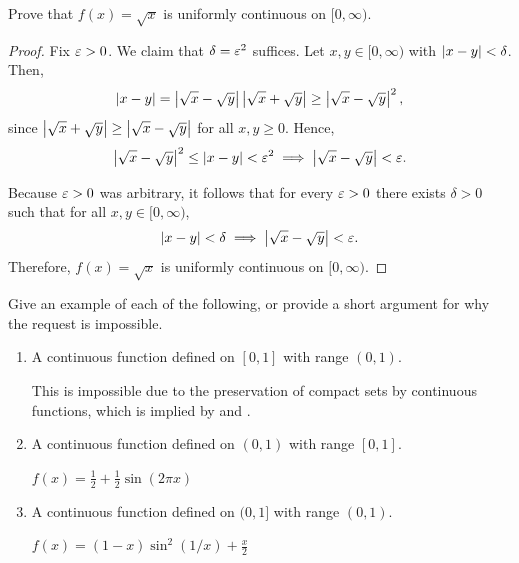 \begin{problem}
  Prove that $f(x) = \sqrt{x}$ is uniformly continuous on $[0, \infty)$.

  \begin{proof}
    Fix $\varepsilon > 0$. We claim that $\delta = \varepsilon^2$ suffices. Let $x,y \in [0,\infty)$ with $\left\lvert x-y \right\rvert < \delta$.
    Then,
    \[
      \left\lvert  x-y  \right\rvert = \left\lvert  \sqrt{x} - \sqrt{y}  \right\rvert \left\lvert  \sqrt{x} + \sqrt{y}  \right\rvert \geq \left\lvert  \sqrt{x}-\sqrt{y}  \right\rvert^2,
    \]
    since $\left\lvert  \sqrt{x} + \sqrt{y}  \right\rvert \geq \left\lvert  \sqrt{x} - \sqrt{y}  \right\rvert$ for all $x,y \geq 0$.
    Hence,
    \[
      \left\lvert  \sqrt{x} - \sqrt{y}  \right\rvert^2 \leq \left\lvert  x-y  \right\rvert < \varepsilon^2 \implies \left\lvert  \sqrt{x} - \sqrt{y}  \right\rvert < \varepsilon.
    \]

    Because $\varepsilon > 0$ was arbitrary, it follows that for every $\varepsilon > 0$ there exists
    $\delta > 0$ such that for all $x,y \in [0,\infty)$,
    \[
      \left\lvert  x-y  \right\rvert < \delta \implies \left\lvert  \sqrt{x}-\sqrt{y}  \right\rvert < \varepsilon.
    \]
    Therefore, $f(x)=\sqrt{x}$ is uniformly continuous on $[0,\infty)$.
  \end{proof}

\end{problem}

\begin{problem}
  Give an example of each of the following, or provide a short argument for why the request is impossible.

  \begin{enumerate}[label=(\alph*)]
    \item A continuous function defined on $[0,1]$ with range $(0, 1)$.

      This is impossible due to the preservation of compact sets by continuous functions, which
      is implied by  and .

    \item A continuous function defined on $(0,1)$ with range $[0,1]$.

      $f(x) = \frac{1}{2} + \frac{1}{2} \sin {(2 \pi x)}$

    \item A continuous function defined on $(0,1]$ with range $(0,1)$.

      $f(x) = (1-x) \sin^{2}(1/x) + \frac{x}{2}$

  \end{enumerate}

\end{problem}


